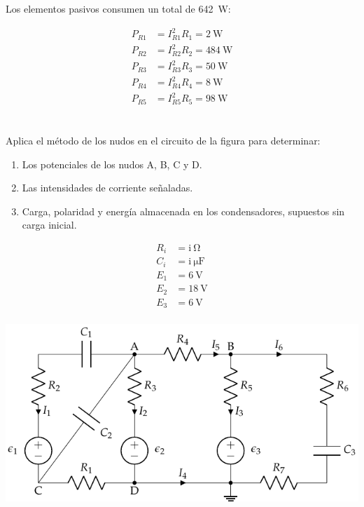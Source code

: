 \documentclass[10pt]{article}
\begin{document}
Los elementos pasivos consumen un total de \SI{642}{\watt}:

\begin{align*}
P_{R1} &= I^2_{R1} R_1 = \SI{2}{\watt}\\
P_{R2} &= I^2_{R2} R_2 = \SI{484}{\watt}\\
P_{R3} &= I^2_{R3} R_3 = \SI{50}{\watt}\\
P_{R4} &= I^2_{R4} R_4 = \SI{8}{\watt}\\
P_{R5} &= I^2_{R5} R_5 = \SI{98}{\watt}
\end{align*}

\clearpage

\section{}
Aplica el método de los nudos en el circuito de la figura para determinar:
\begin{enumerate}
\item Los potenciales de los nudos A, B, C y D.
\item Las intensidades de corriente señaladas.
\item Carga, polaridad y energía almacenada en los condensadores,
  supuestos sin carga inicial.
\end{enumerate}

\begin{minipage}[c]{0.3\textwidth}
  \begin{align*}
    R_i &= \mathrm{i\ } \si{\ohm}\\
    C_i &= \mathrm{i\ } \si{\micro\farad}\\
    E_1 &= \SI{6}{\volt}\\
    E_2 &= \SI{18}{\volt}\\
    E_3 &= \SI{6}{\volt}\\
  \end{align*}
\end{minipage}
\begin{minipage}[c]{0.7\textwidth}
  \includegraphics[width=\textwidth]{figs/nudos_condensadores.pdf}
\end{minipage}
\end{document}
